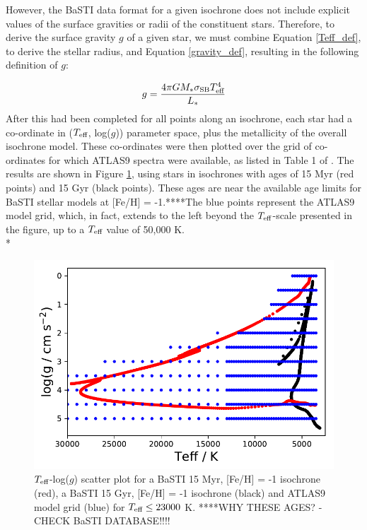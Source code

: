 \documentclass[12pt, a4paper]{report}
\begin{document}
However, the BaSTI data format for a given isochrone does not include explicit values of the surface gravities or radii of the constituent stars. Therefore, to derive the surface gravity $g$ of a given star, we must combine Equation \ref{Teff_def}, to derive the stellar radius, and Equation \ref{gravity_def}, resulting in the following definition of $g$:

\begin{equation}
\label{gravity_LT_calc}
g = \frac{4 \pi G M_{*} \sigma_{\textnormal{SB}} T_{\textnormal{eff}}^{4}}{L_{*}}
\end{equation}
After this had been completed for all points along an isochrone, each star had a co-ordinate in ($T_{\textnormal{eff}}$, log($g$)) parameter space, plus the metallicity of the overall isochrone model. These co-ordinates were then plotted over the grid of co-ordinates for which ATLAS9 spectra were available, as listed in Table 1 of \cite{2004astro.ph..5087C}. The results are shown in Figure \ref{Teff-logg coverage}, using stars in isochrones with ages of 15 Myr (red points) and 15 Gyr (black points). These ages are near the available age limits for BaSTI stellar models at [Fe/H] = -1.****The blue points represent the ATLAS9 model grid, which, in fact, extends to the left beyond the $T_{\textnormal{eff}}$-scale presented in the figure, up to a $T_{\textnormal{eff}}$ value of 50,000 K.\\*

\begin{figure}[h!]
\begin{center}
\includegraphics[width=1.0\textwidth]{ATLAS9_grid_BaSTI_coverage_2ages_max.pdf}
\caption{$T_{\textnormal{eff}}$-log($g$) scatter plot for a BaSTI 15 Myr, [Fe/H] = -1 isochrone (red), a BaSTI 15 Gyr, [Fe/H] = -1 isochrone (black) and ATLAS9 model grid (blue) for $T_{\textnormal{eff}} \leq 23000$ K. ****WHY THESE AGES? - CHECK BaSTI DATABASE!!!!}
\label{Teff-logg coverage}
\end{center}
\end{figure}
\end{document}
